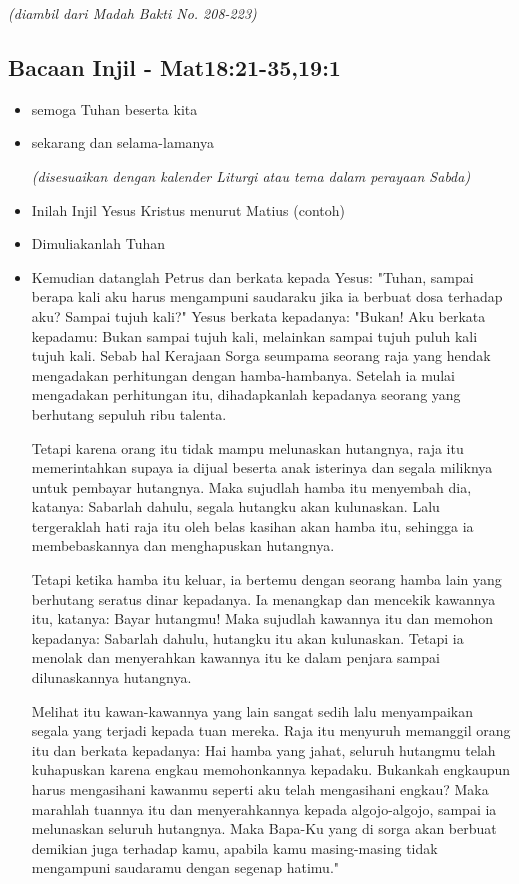 \documentclass[a4paper,12pt]{article}
\newcommand{\BU}[1]{\begin{itemize} \item[U:] #1 \end{itemize}}
\newcommand{\BP}[1]{\begin{itemize} \item[P:] #1 \end{itemize}}
\begin{document}
\textit{(diambil dari Madah Bakti No. 208-223)}

\subsection*{Bacaan Injil - Mat18:21-35,19:1}

\BP{semoga Tuhan beserta kita}

\BU{sekarang dan selama-lamanya

\textit{(disesuaikan dengan kalender Liturgi atau tema dalam perayaan Sabda)}
}

\BP{Inilah Injil Yesus Kristus menurut Matius (contoh)}

\BU{Dimuliakanlah Tuhan}

\BP{Kemudian datanglah Petrus dan berkata kepada Yesus: "Tuhan, sampai berapa kali aku harus mengampuni saudaraku jika ia berbuat dosa terhadap aku? Sampai tujuh kali?"
Yesus berkata kepadanya: "Bukan! Aku berkata kepadamu: Bukan sampai tujuh kali, melainkan sampai tujuh puluh kali tujuh kali.
Sebab hal Kerajaan Sorga seumpama seorang raja yang hendak mengadakan perhitungan dengan hamba-hambanya.
Setelah ia mulai mengadakan perhitungan itu, dihadapkanlah kepadanya seorang yang berhutang sepuluh ribu talenta.

Tetapi karena orang itu tidak mampu melunaskan hutangnya, raja itu memerintahkan supaya ia dijual beserta anak isterinya dan segala miliknya untuk pembayar hutangnya.
Maka sujudlah hamba itu menyembah dia, katanya: Sabarlah dahulu, segala hutangku akan kulunaskan.
Lalu tergeraklah hati raja itu oleh belas kasihan akan hamba itu, sehingga ia membebaskannya dan menghapuskan hutangnya.

Tetapi ketika hamba itu keluar, ia bertemu dengan seorang hamba lain yang berhutang seratus dinar kepadanya. Ia menangkap dan mencekik kawannya itu, katanya: Bayar hutangmu!
Maka sujudlah kawannya itu dan memohon kepadanya: Sabarlah dahulu, hutangku itu akan kulunaskan.
Tetapi ia menolak dan menyerahkan kawannya itu ke dalam penjara sampai dilunaskannya hutangnya.

Melihat itu kawan-kawannya yang lain sangat sedih lalu menyampaikan segala yang terjadi kepada tuan mereka.
Raja itu menyuruh memanggil orang itu dan berkata kepadanya: Hai hamba yang jahat, seluruh hutangmu telah kuhapuskan karena engkau memohonkannya kepadaku.
Bukankah engkaupun harus mengasihani kawanmu seperti aku telah mengasihani engkau?
Maka marahlah tuannya itu dan menyerahkannya kepada algojo-algojo, sampai ia melunaskan seluruh hutangnya.
Maka Bapa-Ku yang di sorga akan berbuat demikian juga terhadap kamu, apabila kamu masing-masing tidak mengampuni saudaramu dengan segenap hatimu."
}
\end{document}
